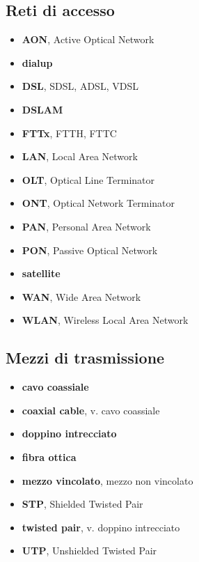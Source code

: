\documentclass[12pt,a4paper]{article}
\begin{document}
\subsection{Reti di accesso}
\begin{itemize}
  \item \textbf{AON}, Active Optical Network
  \item \textbf{dialup}
  \item \textbf{DSL}, SDSL, ADSL, VDSL
  \item \textbf{DSLAM}
  \item \textbf{FTTx}, FTTH, FTTC
  \item \textbf{LAN}, Local Area Network
  \item \textbf{OLT}, Optical Line Terminator
  \item \textbf{ONT}, Optical Network Terminator
  \item \textbf{PAN}, Personal Area Network
  \item \textbf{PON}, Passive Optical Network
  \item \textbf{satellite}
  \item \textbf{WAN}, Wide Area Network
  \item \textbf{WLAN}, Wireless Local Area Network
\end{itemize}

\subsection{Mezzi di trasmissione}
\begin{itemize}
  \item \textbf{cavo coassiale}
  \item \textbf{coaxial cable}, v. cavo coassiale
  \item \textbf{doppino intrecciato}
  \item \textbf{fibra ottica}
  \item \textbf{mezzo vincolato}, mezzo non vincolato
  \item \textbf{STP}, Shielded Twisted Pair
  \item \textbf{twisted pair}, v. doppino intrecciato
  \item \textbf{UTP}, Unshielded Twisted Pair
\end{itemize}
\end{document}
